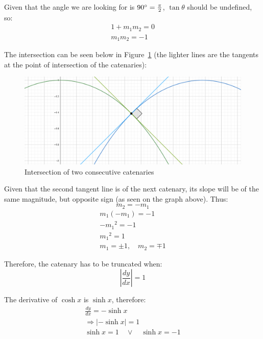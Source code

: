\documentclass[12pt]{article}
\begin{document}
        Given that the angle we are looking for is $90\degree = \frac{\pi}{2}$, $\tan\theta$ should be undefined, so:
        \begin{align*}
            1 + m_1 m_2 = 0 \\
            m_1 m_2 = -1
        \end{align*}

        The intersection can be seen below in Figure~\ref{fig:intersection} (the lighter lines are the tangents at the point of intersection of the catenaries):

        \begin{figure}[H]
            \centering
            \includegraphics[width=0.6\linewidth]{images/slope_1.png}
            \caption[Intersection of two consecutive catenaries]{Intersection of two consecutive catenaries\footnotemark}\label{fig:intersection}
        \end{figure}

        Given that the second tangent line is of the next catenary, its slope will be of the same magnitude, but opposite sign (as seen on the graph above). Thus:
        \begin{equation}\label{eq:tangent_intersection}
            m_2 = - m_1
        \end{equation}
        \begin{align*}
            m_1 (-m_1) = -1 \\
            - {m_1}^2 = -1 \\
            {m_1}^2 = 1 \\
            m_1 = \pm 1, \quad m_2 = \mp 1
        \end{align*} 

        Therefore, the catenary has to be truncated when:
        \begin{equation}
            | \frac{dy}{dx} | = 1
        \end{equation}

        The derivative of $\cosh x$ is $\sinh x$, therefore:
        \begin{align*}
            \frac{dy}{dx} = - \sinh x \\
            \Rightarrow | - \sinh x | = 1 \\
            \sinh x = 1 \quad\lor\quad \sinh x = -1
        \end{align*}
\end{document}
